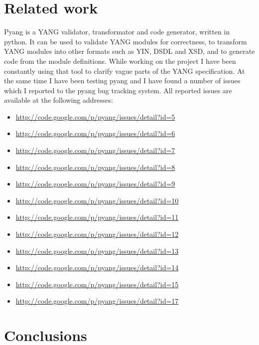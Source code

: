 \documentclass[conference]{IEEEtran}
\begin{document}
\section{Related work}
Pyang \cite{bib8} is a YANG validator, transformator and code generator, written in python. It can be used to validate YANG modules for correctness, to transform YANG modules into other formats such as YIN, DSDL and XSD, and to generate code from the module definitions. While working on the project I have been constantly using that tool to clarify vague parts of the YANG specification. At the same time I have been testing pyang and I have found a number of issues which I reported to the pyang bug tracking system. All reported issues are available at the following addresses:
\begin{itemize}
\item \url{http://code.google.com/p/pyang/issues/detail?id=5}
\item \url{http://code.google.com/p/pyang/issues/detail?id=6}
\item \url{http://code.google.com/p/pyang/issues/detail?id=7}
\item \url{http://code.google.com/p/pyang/issues/detail?id=8}
\item \url{http://code.google.com/p/pyang/issues/detail?id=9}
\item \url{http://code.google.com/p/pyang/issues/detail?id=10}
\item \url{http://code.google.com/p/pyang/issues/detail?id=11}
\item \url{http://code.google.com/p/pyang/issues/detail?id=12}
\item \url{http://code.google.com/p/pyang/issues/detail?id=13}
\item \url{http://code.google.com/p/pyang/issues/detail?id=14}
\item \url{http://code.google.com/p/pyang/issues/detail?id=15}
\item \url{http://code.google.com/p/pyang/issues/detail?id=17}
\end{itemize}

\section{Conclusions}
\end{document}
